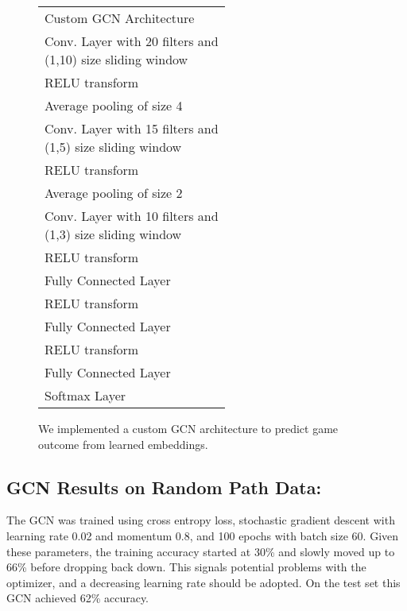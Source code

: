 \begin{figure}[h!]
  \centering
\begin{tabular}{l |}
    \rowcolor{gray!20}
    Custom GCN Architecture \\
    \rowcolor{blue!20}
    \pbox{20cm}{Conv. Layer with 20 filters and \\ (1,10) size sliding window} \\
    \rowcolor{green!20}
    RELU transform \\
    \rowcolor{blue!20}
    Average pooling of size 4 \\
    \rowcolor{green!20}
    \pbox{20cm}{Conv. Layer with 15 filters and \\ (1,5) size sliding window} \\
    \rowcolor{blue!20}
    RELU transform \\
    \rowcolor{green!20}
    Average pooling of size 2 \\
    \rowcolor{blue!20}
    \pbox{20cm}{Conv. Layer with 10 filters and \\ (1,3) size sliding window} \\
    \rowcolor{green!20}
    RELU transform \\
    \rowcolor{blue!20}
    Fully Connected Layer \\
    \rowcolor{green!20}
    RELU transform \\
    \rowcolor{blue!20}
    Fully Connected Layer \\
    \rowcolor{green!20}
    RELU transform \\
    \rowcolor{blue!20}
    Fully Connected Layer \\
    \rowcolor{green!20}
    Softmax Layer \\
\end{tabular}
\caption{We implemented a custom GCN architecture to predict game outcome from learned embeddings.}
  \label{fig:GCN_architecture}
\end{figure}

\subsection{GCN Results on Random Path Data:}

The GCN was trained using cross entropy loss, stochastic gradient descent with learning rate 0.02 and momentum 0.8, and 100 epochs with batch size 60. Given these parameters, the training accuracy started at 30\% and slowly moved up to 66\% before dropping back down. This signals potential problems with the optimizer, and a decreasing learning rate should be adopted. On the test set this GCN achieved 62\% accuracy. 

